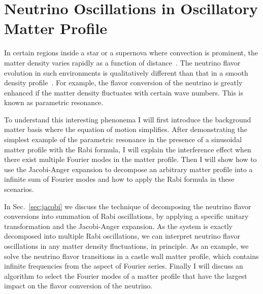 
\chapter{\label{chap:matter}Neutrino Oscillations in Oscillatory Matter Profile}

In certain regions inside a star or a supernova where convection is prominent, the matter density varies rapidly as a function of distance~\cite{Muller2015, Couch2015}. The neutrino flavor evolution in such environments is qualitatively different than that in a smooth density profile~\cite{Krastev1989, Loreti1994,Akhmedov2000, Friedland2006,Kneller2010,Kneller2013,Patton2014}. For example, the flavor conversion of the neutrino is greatly enhanced if the matter density fluctuates with certain wave numbers. This is known as parametric resonance.

To understand this interesting phenonema I will first introduce the background matter basis where the equation of motion simplifies. After demonstrating the simplest example of the parametric resonance in the presence of a sinusoidal matter profile with the Rabi formula, I will explain the interference effect when there exist multiple Fourier modes in the matter profile. Then I will show how to use the Jacobi-Anger expansion to decompose an arbitrary matter profile into a infinite sum of Fourier modes and how to apply the Rabi formula in these scenarios.

In Sec.~\ref{sec:jacobi} we discuss the technique of decomposing the neutrino flavor conversions into summation of Rabi oscillations, by applying a specific unitary transformation and the Jacobi-Anger expansion. As the system is exactly decomposed into multiple Rabi oscillations, we can interpret neutrino flavor oscillations in any matter density fluctuations, in principle. As an example, we solve the neutrino flavor transitions in a castle wall matter profile, which contains infinite frequencies from the aspect of Fourier series. Finally I will discuss an algorithm to select the Fourier modes of a matter profile that have the largest impact on the flavor conversion of the neutrino.






